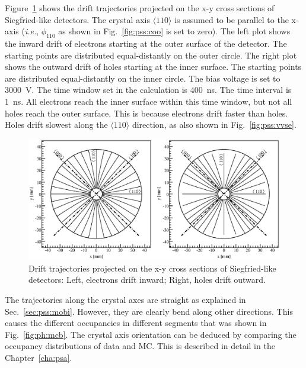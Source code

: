 Figure~\ref{fig:pss:trjs} shows the drift trajectories projected on the x-y cross sections of Siegfried-like detectors. The crystal axis $\langle 110 \rangle$ is assumed to be parallel to the x-axis (\textit{i.e.}, $\phi_{110}$ as shown in Fig.~\ref{fig:pss:coo} is set to zero). The left plot shows the inward drift of electrons starting at the outer surface of the detector. The starting points are distributed equal-distantly on the outer circle. The right plot shows the outward drift of holes starting at the inner surface. The starting points are distributed equal-distantly on the inner circle. The bias voltage is set to 3000~V. The time window set in the calculation is 400~ns. The time interval is 1~ns. All electrons reach the inner surface within this time window, but not all holes reach the outer surface. This is because electrons drift faster than holes. Holes drift slowest along the $\langle 110 \rangle$ direction, as also shown in Fig.~\ref{fig:pss:vvse}.
\begin{figure}[tbhp]
\centering
\includegraphics[width=\textwidth]{trjs}
\caption{Drift trajectories projected on the x-y cross sections of Siegfried-like detectors: Left, electrons drift inward; Right, holes drift outward.}
\label{fig:pss:trjs}
\end{figure}

The trajectories along the crystal axes are straight as explained in Sec.~\ref{sec:pss:mobi}. However, they are clearly bend along other directions. This causes the different occupancies in different segments that was shown in Fig.~\ref{fig:ph:mcb}. The crystal axis orientation can be deduced by comparing the occupancy distributions of data and MC. This is described in detail in the Chapter~\ref{cha:psa}.


